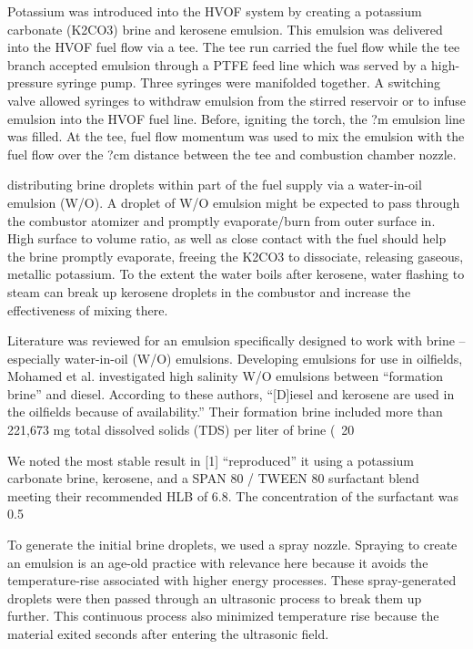Potassium was introduced into the HVOF system by creating a potassium carbonate (K2CO3) brine and kerosene emulsion. This emulsion was delivered into the HVOF fuel flow via a tee. The tee run carried the fuel flow while the tee branch accepted emulsion through a PTFE feed line which was served by a high-pressure syringe pump. Three syringes were manifolded together. A switching valve allowed syringes to withdraw emulsion from the stirred reservoir or to infuse emulsion into the HVOF fuel line. Before, igniting the torch, the ?m emulsion line was filled. At the tee, fuel flow momentum was used to mix the emulsion with the fuel flow over the ?cm distance between the tee and combustion chamber nozzle. 


distributing brine droplets within part of the fuel supply via a water-in-oil emulsion (W/O). A droplet of W/O emulsion might be expected to pass through the combustor atomizer and promptly evaporate/burn from outer surface in. High surface to volume ratio, as well as close contact with the fuel should help the brine promptly evaporate, freeing the K2CO3 to dissociate, releasing gaseous, metallic potassium. To the extent the water boils after kerosene, water flashing to steam can break up kerosene droplets in the combustor and increase the effectiveness of mixing there. 

Literature was reviewed for an emulsion specifically designed to work with brine – especially water-in-oil (W/O) emulsions.  Developing emulsions for use in oilfields, Mohamed et al.\cite{mohamedInfluenceSurfactantStructure2017a} investigated high salinity W/O emulsions between “formation brine” and diesel. According to these authors, “[D]iesel and kerosene are used in the oilfields because of availability.” Their formation brine included more than 221,673 mg total dissolved solids (TDS) per liter of brine (~20%

We noted the most stable result in ​[1]​ “reproduced” it using a potassium carbonate brine, kerosene, and a SPAN 80 / TWEEN 80 surfactant blend meeting their recommended HLB of 6.8. The concentration of the surfactant was 0.5%

To generate the initial brine droplets, we used a spray nozzle. Spraying to create an emulsion is an age-old practice \cite{atkinsonKeroseneEmulsionHow1890} with relevance here because it avoids the temperature-rise associated with higher energy processes. These spray-generated droplets were then passed through an ultrasonic process to break them up further. This continuous process also minimized temperature rise because the material exited seconds after entering the ultrasonic field. 

